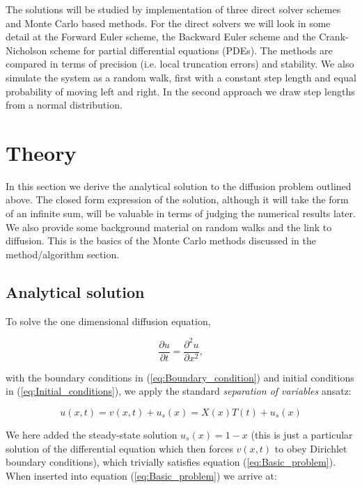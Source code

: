 \documentclass[a4paper, 11pt, notitlepage,english]{article}
\begin{document}
The solutions will be studied by implementation of three direct solver schemes and Monte Carlo based methods. For the direct solvers we will look in some detail at the Forward Euler scheme, the Backward Euler scheme and the Crank-Nicholson scheme for partial differential equations (PDEs). The methods are compared in terms of precision (i.e. local truncation errors) and stability. We also simulate the system as a random walk, first with a constant step length and equal probability of moving left and right. In the second approach we draw step lengths from a normal distribution. 

\section{Theory}
In this section we derive the analytical solution to the diffusion problem outlined above. The closed form expression of the solution, although it will take the form of an infinite sum, will be valuable in terms of judging the numerical results later. We also provide some background material on random walks and the link to diffusion. This is the basics of the Monte Carlo methods discussed in the method/algorithm section.

\subsection{Analytical solution}
To solve the one dimensional diffusion equation, 

\begin{equation}
\frac{\partial u}{\partial t} = \frac{\partial^2 u}{\partial x^2},
\label{eq:Basic_problem}
\end{equation}

with the boundary conditions in (\ref{eq:Boundary_condition}) and initial conditions in (\ref{eq:Initial_conditions}), we apply the standard \emph{separation of variables} ansatz:

\begin{equation}
 u(x,t) = v(x,t) + u_s(x) = X(x)T(t) + u_s(x)
\label{eq:Separation of variables}
\end{equation}

We here added the steady-state solution $u_s(x) = 1-x$ (this is just a particular solution of the differential equation which then forces $v(x,t)$ to obey Dirichlet boundary conditions), which trivially satisfies equation (\ref{eq:Basic_problem}). When inserted into equation (\ref{eq:Basic_problem}) we arrive at:
\end{document}
